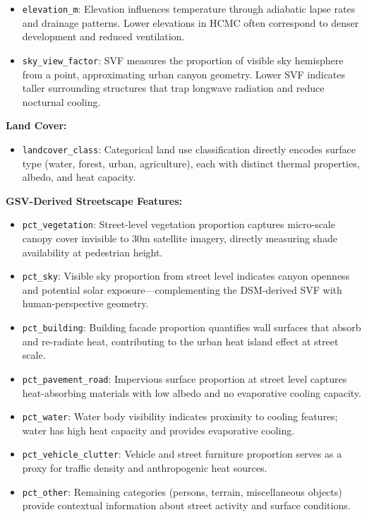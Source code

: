 \documentclass[
]{report}
\providecommand{\tightlist}{%
  \setlength{\itemsep}{0pt}\setlength{\parskip}{0pt}}
\begin{document}
\begin{itemize}
\item
  \texttt{elevation\_m}: Elevation influences temperature through
  adiabatic lapse rates and drainage patterns. Lower elevations in HCMC
  often correspond to denser development and reduced ventilation.
\item
  \texttt{sky\_view\_factor}: SVF measures the proportion of visible sky
  hemisphere from a point, approximating urban canyon geometry. Lower
  SVF indicates taller surrounding structures that trap longwave
  radiation and reduce nocturnal cooling.
\end{itemize}

\textbf{Land Cover:}

\begin{itemize}
\tightlist
\item
  \texttt{landcover\_class}: Categorical land use classification
  directly encodes surface type (water, forest, urban, agriculture),
  each with distinct thermal properties, albedo, and heat capacity.
\end{itemize}

\textbf{GSV-Derived Streetscape Features:}

\begin{itemize}
\item
  \texttt{pct\_vegetation}: Street-level vegetation proportion captures
  micro-scale canopy cover invisible to 30m satellite imagery, directly
  measuring shade availability at pedestrian height.
\item
  \texttt{pct\_sky}: Visible sky proportion from street level indicates
  canyon openness and potential solar exposure---complementing the
  DSM-derived SVF with human-perspective geometry.
\item
  \texttt{pct\_building}: Building facade proportion quantifies wall
  surfaces that absorb and re-radiate heat, contributing to the urban
  heat island effect at street scale.
\item
  \texttt{pct\_pavement\_road}: Impervious surface proportion at street
  level captures heat-absorbing materials with low albedo and no
  evaporative cooling capacity.
\item
  \texttt{pct\_water}: Water body visibility indicates proximity to
  cooling features; water has high heat capacity and provides
  evaporative cooling.
\item
  \texttt{pct\_vehicle\_clutter}: Vehicle and street furniture
  proportion serves as a proxy for traffic density and anthropogenic
  heat sources.
\item
  \texttt{pct\_other}: Remaining categories (persons, terrain,
  miscellaneous objects) provide contextual information about street
  activity and surface conditions.
\end{itemize}
\end{document}
